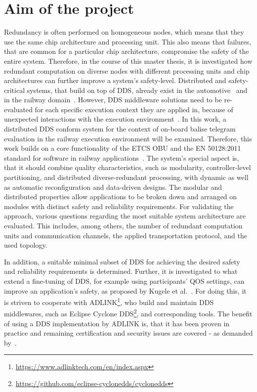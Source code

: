 \documentclass[a4paper, 12pt]{scrartcl}
\begin{document}
\section*{Aim of the project}
Redundancy is often performed on homogeneous nodes, which means that they use the same chip architecture and processing unit.
This also means that failures, that are common for a particular chip architecture, compromise the safety of the entire system.
Therefore, in the course of this master thesis, it is investigated how redundant computation on diverse nodes with different processing units and chip architectures can further improve a system's safety-level.
Distributed and safety-critical systems, that build on top of \ac{DDS}, already exist in the automotive~\cite{DistributedSafety2020} and in the railway domain~\cite{DDSInURail}.
However, \ac{DDS} middleware solutions need to be re-evaluated for each specific execution context they are applied in, because of unexpected interactions with the execution environment~\cite{CotroneoDDSFailureAnalysis}.
In this work, a distributed \ac{DDS} conform system for the context of on-board balise telegram evaluation in the railway execution environment will be examined.
Therefore, this work builds on a core functionality of the \ac{ETCS OBU} and the EN 50128:2011 standard for software in railway applications~\cite{BoulangerStandards}.
The system's special aspect is, that it should combine quality characteristics, such as modularity, control\-ler-level partitioning, and distributed diverse-redundant processing, with dynamic as well as automatic reconfiguration and data-driven designs.
The modular and distributed properties allow applications to be broken down and arranged on modules with distinct safety and reliability requirements.
For validating the approach, various questions regarding the most suitable system architecture are evaluated.
This includes, among others, the number of redundant computation units and communication channels, the applied transportation protocol, and the used topology.

In addition, a suitable minimal subset of \ac{DDS} for achieving the desired safety and reliability requirements is determined.
Further, it is investigated to what extend a fine-tuning of \ac{DDS}, for example using participants' \ac{QOS} settings, can improve an application's safety, as proposed by Kugele et al.~\cite{KugeleDataCentricForAuto}.
For doing this, it is striven to cooperate with ADLINK\footnote{\url{https://www.adlinktech.com/en/index.aspx}}, who build and maintain \ac{DDS} middlewares, such as Eclipse Cyclone DDS\footnote{\url{https://github.com/eclipse-cyclonedds/cyclonedds}}, and corresponding tools.
The benefit of using a \ac{DDS} implementation by ADLINK is, that it has been proven in practice and remaining certification and security issues are covered - as demanded by~\cite{KugeleDataCentricForAuto}.
\end{document}
